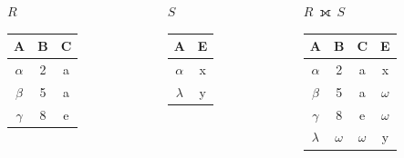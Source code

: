 \documentclass[11pt]{beamer}
\begin{document}
  \begin{frame}
    \begin{columns}[T]
      \begin{column}{0.3\textwidth}
        \centering $R$
        \medskip \\
        \begin{tabular}{|c|c|c|}
          \hline
          \textbf{A} & \textbf{B} & \textbf{C}  \\[0.5ex] \hline\hline
          $\alpha$ & 2 & a\\ \hline
          $\beta$ & 5 & a\\ \hline
          $\gamma$ & 8 & e\\ \hline
        \end{tabular}
      \end{column}
      \begin{column}{0.3\textwidth}
        \centering $S$
        \medskip \\
        \begin{tabular}{|c|c|}
          \hline
          \textbf{A} & \textbf{E} \\[0.5ex] \hline\hline
          $\alpha$ & x\\ \hline
          $\lambda$ & y\\ \hline
        \end{tabular}
      \end{column}
      \begin{column}{0.3\textwidth}
        \centering $R~⟗~S$
        \medskip \\
        \begin{tabular}{|c|c|c|c|}
          \hline
          \textbf{A} & \textbf{B} & \textbf{C} & \textbf{E}\\[0.5ex] \hline\hline
          $\alpha$ & 2 & a & x\\ \hline
          $\beta$ & 5 & a & \cellcolor{blue!25}$\omega$ \\ \hline
          $\gamma$ & 8 & e & \cellcolor{blue!25}$\omega$ \\ \hline
          $\lambda$ & \cellcolor{blue!25}$\omega$ & \cellcolor{blue!25}$\omega$ & y \\ \hline
        \end{tabular}
      \end{column}
    \end{columns}
  \end{frame}
\end{document}
